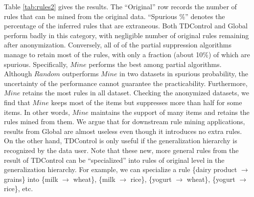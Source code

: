 Table \ref{tab:rules2} gives the results. The ``Original'' row records the
number of rules that can be mined from the original data. ``Spurious \%''
denotes the percentage of the inferred rules that are extraneous.
Both TDControl and Global perform badly in this category, with
negligible number of original rules remaining after anonymization.
Conversely, all of of the partial
suppression algorithms manage to retain most of the rules, with only a
fraction (about 10\%) of which are spurious. Specifically, $Mine$ performs
the best among partial algorithms. Although $Random$ outperforms $Mine$
in two datasets in spurious probability, the uncertainty of the performance  cannot
guarantee the practicability. Furthermore, $Mine$ retains the most
rules in all dataset. Checking the anonymized datasets, we find that $Mine$ keeps
most of the items  but suppresses more than half for some items. In other words,
$Mine$ maintains the support of many items and retains the rules mined from them.
We argue that for downstream
rule mining applications, results from Global are almost
useless even though it introduces no extra rules. On the other hand, TDControl
is only useful if the generalization hierarchy is recognized by the data user.
Note that these new, more general rules from the result of TDControl can be
``specialized'' into rules of original level in the generalization hierarchy.
For example, we can specialize a rule \{dairy product $\rightarrow$ grains\}
into
\{milk $\rightarrow$ wheat\},
\{milk $\rightarrow$ rice\},
\{yogurt $\rightarrow$ wheat\},
\{yogurt $\rightarrow$ rice\}, etc.
